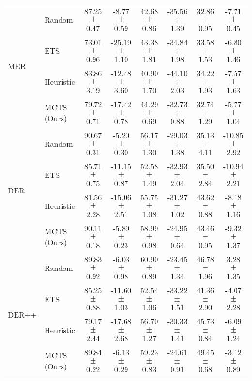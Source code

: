 \begin{tabular}{llcccccc}
	\multirow{4}{*}{MER}   & Random            & 87.25 $\pm$ 0.47  & -8.77 $\pm$ 0.59   & 42.68 $\pm$ 0.86  & -35.56 $\pm$ 1.39  & 32.86 $\pm$ 0.95    & -7.71 $\pm$ 0.45    \\
	& ETS               & 73.01 $\pm$ 0.96  & -25.19 $\pm$ 1.10  & 43.38 $\pm$ 1.81  & -34.84 $\pm$ 1.98  & 33.58 $\pm$ 1.53    & -6.80 $\pm$ 1.46    \\
	& Heuristic           & 83.86 $\pm$ 3.19  & -12.48 $\pm$ 3.60  & 40.90 $\pm$ 1.70  & -44.10 $\pm$ 2.03  & 34.22 $\pm$ 1.93    & -7.57 $\pm$ 1.63    \\
	& MCTS (Ours)              & 79.72 $\pm$ 0.71  & -17.42 $\pm$ 0.78  & 44.29 $\pm$ 0.69  & -32.73 $\pm$ 0.88  & 32.74 $\pm$ 1.29    & -5.77 $\pm$ 1.04    \\ \midrule
	\multirow{4}{*}{DER}   & Random            & 90.67 $\pm$ 0.31  & -5.20 $\pm$ 0.30   & 56.17 $\pm$ 1.30  & -29.03 $\pm$ 1.38  & 35.13 $\pm$ 4.11    & -10.85 $\pm$ 2.92   \\
	& ETS               & 85.71 $\pm$ 0.75  & -11.15 $\pm$ 0.87  & 52.58 $\pm$ 1.49  & -32.93 $\pm$ 2.04  & 35.50 $\pm$ 2.84    & -10.94 $\pm$ 2.21   \\
	& Heuristic           & 81.56 $\pm$ 2.28  & -15.06 $\pm$ 2.51  & 55.75 $\pm$ 1.08  & -31.27 $\pm$ 1.02  & 43.62 $\pm$ 0.88    & -8.18 $\pm$ 1.16    \\
	& MCTS (Ours)              & 90.11 $\pm$ 0.18  & -5.89 $\pm$ 0.23   & 58.99 $\pm$ 0.98  & -24.95 $\pm$ 0.64  & 43.46 $\pm$ 0.95    & -9.32 $\pm$ 1.37    \\ \midrule
	\multirow{4}{*}{DER++} & Random            & 89.83 $\pm$ 0.92  & -6.03 $\pm$ 0.98   & 60.90 $\pm$ 0.89  & -23.45 $\pm$ 1.34  & 46.78 $\pm$ 1.96    & 3.28 $\pm$ 1.35     \\
	& ETS               & 85.25 $\pm$ 0.88  & -11.60 $\pm$ 1.03  & 52.54 $\pm$ 1.06  & -33.22 $\pm$ 1.51  & 41.36 $\pm$ 2.90    & -4.07 $\pm$ 2.28    \\
	& Heuristic           & 79.17 $\pm$ 2.44  & -17.68 $\pm$ 2.68  & 56.70 $\pm$ 1.27  & -30.33 $\pm$ 1.41  & 45.73 $\pm$ 0.84    & -6.09 $\pm$ 1.24    \\
	& MCTS (Ours)              & 89.84 $\pm$ 0.22  & -6.13 $\pm$ 0.29   & 59.23 $\pm$ 0.83  & -24.61 $\pm$ 0.91  & 49.45 $\pm$ 0.68    & -3.12 $\pm$ 0.89   \\ \bottomrule
\end{tabular}
